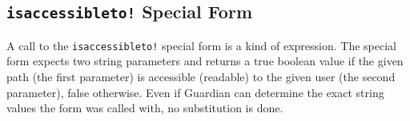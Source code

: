 
\subsection{\texttt{isaccessibleto!} Special Form}
{
	A call to the \texttt{isaccessibleto!} special form
	is a kind of expression.
	The special form expects two string parameters and returns a true boolean
	value if the given path (the first parameter) is accessible (readable) to
	the given user (the second parameter), false
	otherwise.
	Even if Guardian can determine the exact string values the form was
	called with, no substitution is done.
}
